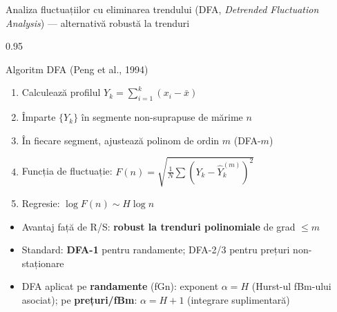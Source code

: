 \documentclass[9pt, aspectratio=169, t]{beamer}
\begin{document}
\begin{frame}[shrink=15]{Analiza fluctuațiilor cu eliminarea trendului (DFA, \textit{Detrended Fluctuation Analysis}) --- alternativă robustă la trenduri}
\begin{cminipage}{0.95\textwidth}
\begin{block}{Algoritm DFA (Peng et al., 1994)}
\begin{enumerate}\setlength{\itemsep}{1pt}
    \item Calculează profilul $Y_k=\sum_{i=1}^k(x_i-\bar{x})$
    \item Împarte $\{Y_k\}$ în segmente non-suprapuse de mărime $n$
    \item În fiecare segment, ajustează polinom de ordin $m$ (DFA-$m$)
    \item Funcția de fluctuație: $F(n)=\sqrt{\frac{1}{N}\sum(Y_k-\hat{Y}_k^{(m)})^2}$
    \item Regresie: $\log F(n)\sim H\log n$
\end{enumerate}
\end{block}
\begin{itemize}\setlength{\itemsep}{0pt}
    \item Avantaj față de R/S: \textbf{robust la trenduri polinomiale} de grad $\leq m$
    \item Standard: \textbf{DFA-1} pentru randamente; DFA-2/3 pentru prețuri non-staționare
    \item DFA aplicat pe \textbf{randamente} (fGn): exponent $\alpha=H$ (Hurst-ul fBm-ului asociat); pe \textbf{prețuri/fBm}: $\alpha=H+1$ (integrare suplimentară)
\end{itemize}
\end{cminipage}
\end{frame}
\end{document}
